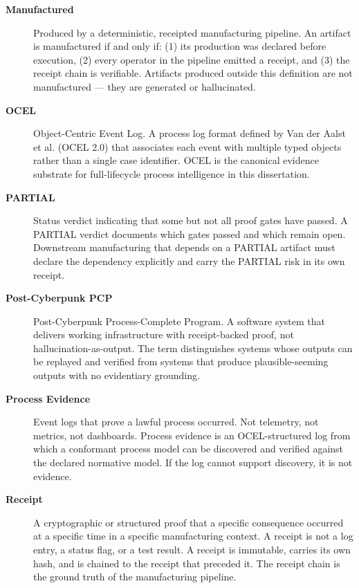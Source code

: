 {\begin{description}
  \item[\textbf{Manufactured}]
    Produced by a deterministic, receipted manufacturing pipeline. An artifact
    is manufactured if and only if: (1) its production was declared before
    execution, (2) every operator in the pipeline emitted a receipt, and
    (3) the receipt chain is verifiable. Artifacts produced outside this
    definition are not manufactured --- they are generated or hallucinated.

  \item[\textbf{OCEL}]
    Object-Centric Event Log. A process log format defined by Van der Aalst
    et al. (OCEL 2.0) that associates each event with multiple typed objects
    rather than a single case identifier. OCEL is the canonical evidence
    substrate for full-lifecycle process intelligence in this dissertation.

  \item[\textbf{PARTIAL}]
    Status verdict indicating that some but not all proof gates have passed.
    A PARTIAL verdict documents which gates passed and which remain open.
    Downstream manufacturing that depends on a PARTIAL artifact must declare
    the dependency explicitly and carry the PARTIAL risk in its own receipt.

  \item[\textbf{Post-Cyberpunk PCP}]
    Post-Cyberpunk Process-Complete Program. A software system that delivers
    working infrastructure with receipt-backed proof, not hallucination-as-output.
    The term distinguishes systems whose outputs can be replayed and verified
    from systems that produce plausible-seeming outputs with no evidentiary
    grounding.

  \item[\textbf{Process Evidence}]
    Event logs that prove a lawful process occurred. Not telemetry, not metrics,
    not dashboards. Process evidence is an OCEL-structured log from which a
    conformant process model can be discovered and verified against the declared
    normative model. If the log cannot support discovery, it is not evidence.

  \item[\textbf{Receipt}]
    A cryptographic or structured proof that a specific consequence occurred
    at a specific time in a specific manufacturing context. A receipt is
    not a log entry, a status flag, or a test result. A receipt is immutable,
    carries its own hash, and is chained to the receipt that preceded it.
    The receipt chain is the ground truth of the manufacturing pipeline.


\end{description}}
